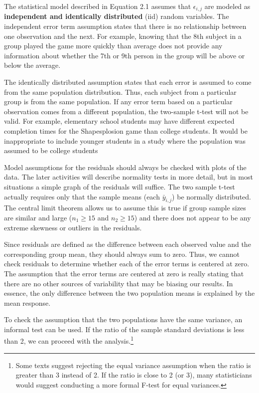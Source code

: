 \documentclass[
]{book}
\begin{document}
The statistical model described in Equation 2.1 assumes that \(\epsilon_{i, j}\) are modeled as \textbf{independent and identically distributed} (iid) random variables. The independent error term assumption states that there is no relationship between one observation and the next. For example, knowing that the 8th subject in a group played the game more quickly than average does not provide any information about whether the 7th or 9th person in the group will be above or below the average.

The identically distributed assumption states that each error is assumed to come from the same population distribution. Thus, each subject from a particular group is from the same population. If any error term
based on a particular observation comes from a different population, the two-sample t-test will not be valid. For example, elementary school students may have different expected completion times for the Shapesplosion game than college students. It would be inappropriate to include younger students in a study where the population was assumed to be college students

Model assumptions for the residuals should always be checked with plots of the data. The later activities will describe normality tests in more detail, but in most situations a simple graph of the residuals will
suffice. The two sample t-test actually requires only that the sample means (each \(\bar{y}_{i,j}\)) be normally distributed. The central limit theorem allows us to assume this is true if group sample sizes are similar and large (\(n_1 \ge 15\) and \(n_2 \ge 15\)) and there does not appear to be any extreme skewness or outliers in the residuals.

Since residuals are defined as the difference between each observed value and the corresponding group mean, they should always sum to zero. Thus, we cannot check residuals to determine whether each of the error
terms is centered at zero. The assumption that the error terms are centered at zero is really stating that there are no other sources of variability that may be biasing our results. In essence, the only difference between the two population means is explained by the mean response.

To check the assumption that the two populations have the same variance, an informal test can be used. If the ratio of the sample standard deviations is less than 2, we can proceed with the analysis.\footnote{Some texts suggest rejecting the equal variance assumption when the ratio is greater than 3 instead of 2. If the ratio is close to 2 (or 3), many statisticians would suggest conducting a more formal F-test for equal variances.}
\end{document}
